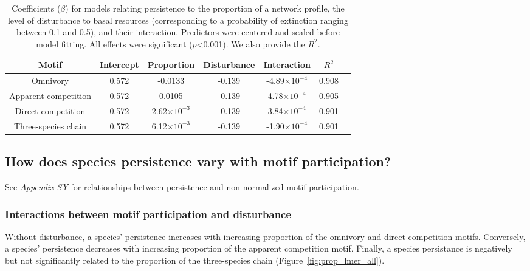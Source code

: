 \documentclass[12pt]{article}
\begin{document}
\begin{spacing}{2.0}
        \begin{table}[h!]
            \caption{Coefficients ($\beta$) for models relating persistence to the proportion of a network profile, the level of disturbance to basal resources (corresponding to a probability of extinction ranging between 0.1 and 0.5), and their interaction. Predictors were centered and scaled before model fitting. All effects were significant ($p$\textless0.001). We also provide the $R^2$. }
            \label{motif_profile_tab}
            \centering
            \begin{tabular}{c|c c c c c | c}
                Motif & Intercept & Proportion & Disturbance & Interaction & $R^2$\\
                \hline
                Omnivory & 0.572 & -0.0133 & -0.139 & -4.89$\times10^{-4}$ & 0.908 \\
                Apparent competition & 0.572 & 0.0105 & -0.139 & 4.78$\times10^{-4}$ & 0.905 \\
                Direct competition & 0.572 & 2.62$\times10^{-3}$ & -0.139 & 3.84$\times10^{-4}$ & 0.901 \\
                Three-species chain & 0.572 & 6.12$\times10^{-3}$ & -0.139 & -1.90$\times10^{-4}$ & 0.901 \\ 
            \end{tabular}
        \end{table}
    
    \clearpage

    
    \subsection*{How does species persistence vary with motif participation?} 
    
        See \emph{Appendix SY} for relationships between persistence and non-normalized motif participation.
    
        \subsubsection*{Interactions between motif participation and disturbance}
        
            Without disturbance, a species' persistence increases with increasing proportion of the omnivory and direct competition motifs. Conversely, a species' persistence decreases with increasing proportion of the apparent competition motif. Finally, a species persistance is  negatively but not significantly related to the proportion of the three-species chain (Figure~\ref{fig:prop_lmer_all}).
            

\end{spacing}
\end{document}
